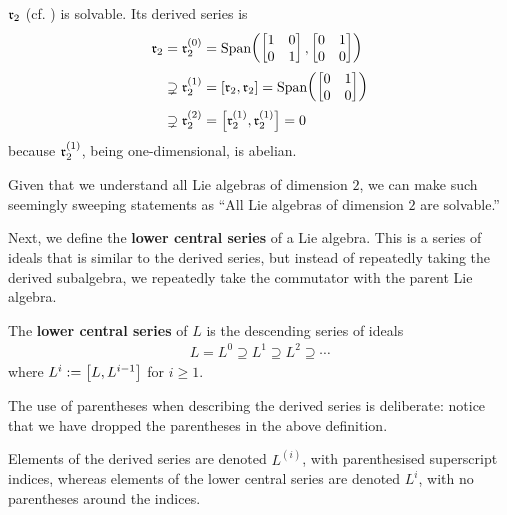 \begin{boxexample}\label{Ch1:Eg:2D_NonAbelian_Lie_Algebra_solvable}
    $\mathfrak{r}_2$ (cf. ) is solvable. Its derived series is
    \begin{align*}
        \mathfrak{r}_2 &= \mathfrak{r}_2^{(0)} = \operatorname{Span}\!\left( 
            \begin{bmatrix}
                1 & 0 \\ 0 & 1
            \end{bmatrix},
            \begin{bmatrix}
                0 & 1 \\ 0 & 0
            \end{bmatrix}
         \right) \\
        &\supsetneq \mathfrak{r}_2^{(1)} = \left[ \mathfrak{r}_2, \mathfrak{r}_2 \right] = \operatorname{Span}\!\left( 
            \begin{bmatrix}
                0 & 1 \\ 0 & 0
            \end{bmatrix}
         \right) \\
        &\supsetneq \mathfrak{r}_2^{(2)} = \left[ \mathfrak{r}_2^{(1)}, \mathfrak{r}_2^{(1)} \right] = 0
    \end{align*}
    because $\mathfrak{r}_2^{(1)}$, being one-dimensional, is abelian.
\end{boxexample}

Given that we understand all Lie algebras of dimension $2$, we can make such seemingly sweeping statements as ``All Lie algebras of dimension $2$ are solvable.''

Next, we define the \textbf{lower central series} of a Lie algebra. This is a series of ideals that is similar to the derived series, but instead of repeatedly taking the derived subalgebra, we repeatedly take the commutator with the parent Lie algebra.

\begin{boxdefinition}
    The \textbf{lower central series} of $L$ is the descending series of ideals
    \begin{align*}
        L = L^{0} \supseteq L^{1} \supseteq L^{2} \supseteq \cdots %
    \end{align*}
    where $L^{i} := \left[ L, L^{i-1} \right]$ for $i \geq 1$. %
\end{boxdefinition}

The use of parentheses when describing the derived series is deliberate: notice that we have dropped the parentheses in the above definition.

\begin{boxconvention}
    Elements of the derived series are denoted $L^{(i)}$, with parenthesised superscript indices, whereas elements of the lower central series are denoted $L^{i}$, with no parentheses around the indices.
\end{boxconvention}

